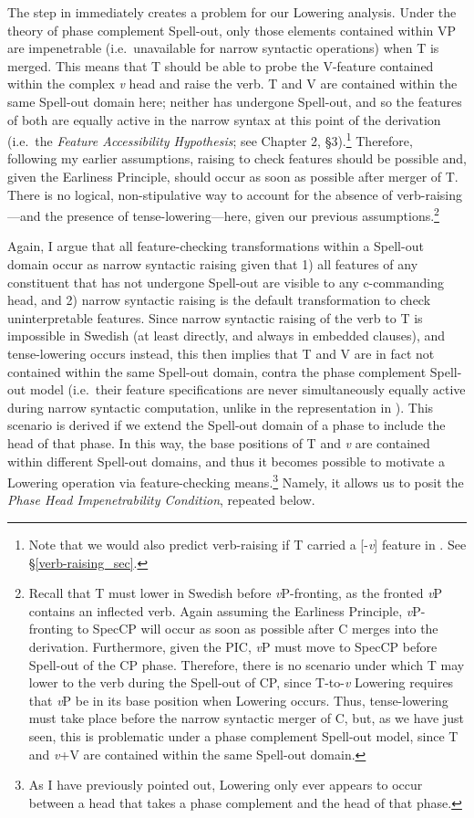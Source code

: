 The step in \Last[b] immediately creates a problem for our Lowering analysis. Under the theory of phase complement Spell-out, only those elements contained within VP are impenetrable (i.e.\ unavailable for narrow syntactic operations) when T is merged. This means that T should be able to probe the V-feature contained within the complex {\it v} head and raise the verb. T and V are contained within the same Spell-out domain here; neither has undergone Spell-out, and so the features of both are equally active in the narrow syntax at this point of the derivation (i.e.\ the {\it Feature Accessibility Hypothesis}; see Chapter 2, \S3).\footnote{Note that we would also predict verb-raising if T carried a [-{\it v}] feature in \Last[b]. See \S\ref{verb-raising_sec}.}  Therefore, following my earlier assumptions, raising to check features should be possible and, given the Earliness Principle, should occur as soon as possible after merger of T. There is no logical, non-stipulative way to account for the absence of verb-raising---and the presence of tense-lowering---here, given our previous assumptions.\footnote{Recall that T must lower in Swedish before {\it v}P-fronting, as the fronted {\it v}P contains an inflected verb. Again assuming the Earliness Principle, {\it v}P-fronting to SpecCP will occur as soon as possible after C merges into the derivation. Furthermore, given the PIC, {\it v}P must move to SpecCP before Spell-out of the CP phase. Therefore, there is no scenario under which T may lower to the verb during the Spell-out of CP, since T-to-{\it v} Lowering requires that {\it v}P be in its base position when Lowering occurs. Thus, tense-lowering must take place before the narrow syntactic merger of C, but, as we have just seen, this is problematic under a phase complement Spell-out model, since T and {\it v}+V are contained within the same Spell-out domain.}

Again, I argue that all feature-checking transformations within a Spell-out domain occur as narrow syntactic raising given that 1) all features of any constituent that has not undergone Spell-out are visible to any c-commanding head, and 2) narrow syntactic raising is the default transformation to check uninterpretable features. Since narrow syntactic raising of the verb to T is impossible in Swedish (at least directly, and always in embedded clauses), and tense-lowering occurs instead, this then implies that T and V are in fact not contained within the same Spell-out domain, contra the phase complement Spell-out model (i.e.\ their feature specifications are never simultaneously equally active during narrow syntactic computation, unlike in the representation in \Last[b]). This scenario is derived if we extend the Spell-out domain of a phase to include the head of that phase. In this way, the base positions of T and {\it v} are contained within different Spell-out domains, and thus it becomes possible to motivate a Lowering operation via feature-checking means.\footnote{As I have previously pointed out, Lowering only ever appears to occur between a head that takes a phase complement and the head of that phase.} Namely, it allows us to posit the {\it Phase Head Impenetrability Condition}, repeated below.

